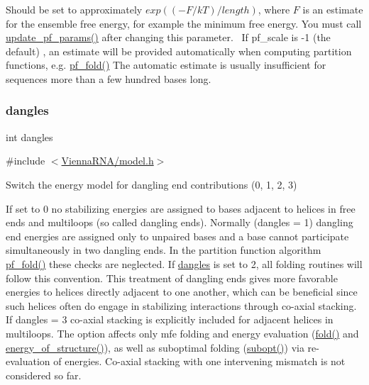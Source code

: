 Should be set to approximately $exp{((-F/kT)/length)}$, where $F$ is an estimate for the ensemble free energy, for example the minimum free energy. You must call \hyperlink{group__part__func__global__deprecated_ga384e927890f9c034ff09fa66da102d28}{update\+\_\+pf\+\_\+params()} after changing this parameter.~\newline
If pf\+\_\+scale is -\/1 (the default) , an estimate will be provided automatically when computing partition functions, e.\+g. \hyperlink{group__part__func__global__deprecated_gadc3db3d98742427e7001a7fd36ef28c2}{pf\+\_\+fold()} The automatic estimate is usually insufficient for sequences more than a few hundred bases long. \mbox{\label{group__model__details_ga72b511ed1201f7e23ec437e468790d74}} 
\subsubsection{\texorpdfstring{dangles}{dangles}}
{\footnotesize\ttfamily int dangles}



{\ttfamily \#include $<$\hyperlink{model_8h}{Vienna\+R\+N\+A/model.\+h}$>$}



Switch the energy model for dangling end contributions (0, 1, 2, 3) 

If set to 0 no stabilizing energies are assigned to bases adjacent to helices in free ends and multiloops (so called dangling ends). Normally (dangles = 1) dangling end energies are assigned only to unpaired bases and a base cannot participate simultaneously in two dangling ends. In the partition function algorithm \hyperlink{group__part__func__global__deprecated_gadc3db3d98742427e7001a7fd36ef28c2}{pf\+\_\+fold()} these checks are neglected. If \hyperlink{group__model__details_ga72b511ed1201f7e23ec437e468790d74}{dangles} is set to 2, all folding routines will follow this convention. This treatment of dangling ends gives more favorable energies to helices directly adjacent to one another, which can be beneficial since such helices often do engage in stabilizing interactions through co-\/axial stacking.~\newline
If dangles = 3 co-\/axial stacking is explicitly included for adjacent helices in multiloops. The option affects only mfe folding and energy evaluation (\hyperlink{group__mfe__global__deprecated_gaadafcb0f140795ae62e5ca027e335a9b}{fold()} and \hyperlink{group__eval__deprecated_gaf93986cb3cb29770ec9cca69c9fab8cf}{energy\+\_\+of\+\_\+structure()}), as well as suboptimal folding (\hyperlink{group__subopt__wuchty_ga700f662506a233e42dd7fda74fafd40e}{subopt()}) via re-\/evaluation of energies. Co-\/axial stacking with one intervening mismatch is not considered so far.

